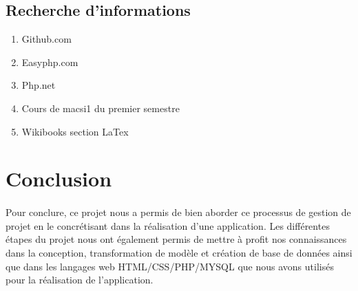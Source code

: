 \documentclass[a4paper, 12pt]{article}
\begin{document}
\subsection{Recherche d’informations}
\begin{enumerate}
	\item Github.com
	\item Easyphp.com
	\item Php.net
	\item Cours de macsi1 du premier semestre
	\item Wikibooks section LaTex
\end{enumerate}

\newpage

\section{Conclusion}
\paragraph{}Pour conclure, ce projet nous a permis de bien aborder ce processus de gestion de projet en le concrétisant dans la réalisation d'une application. Les différentes étapes du projet nous ont également permis de mettre à profit nos connaissances dans la conception, transformation de modèle et création de base de données ainsi que dans les langages web HTML/CSS/PHP/MYSQL que nous avons utilisés pour la réalisation de l'application.
\end{document}
